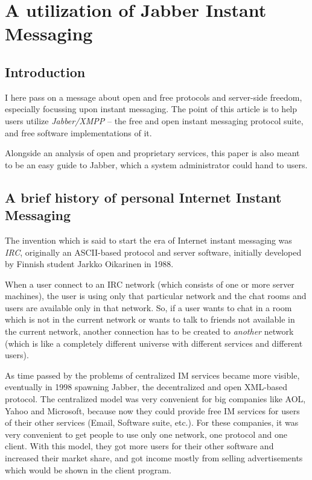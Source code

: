 \begin{savequote}
\end{savequote}
\chapter{A utilization of Jabber Instant Messaging}
\label{c:jim_client_server}


\section{Introduction}
\label{s:jim_client_server:introduction}

I here pass on a message about open and free protocols and server-side freedom,
especially focussing upon instant messaging. The point of this article is to
help users utilize \textit{Jabber/XMPP} – the free and open instant messaging
protocol suite, and free software implementations of it.

Alongside an analysis of open and proprietary services, this paper is also meant
to be an easy guide to Jabber, which a system administrator could hand to users.


\section{A brief history of personal Internet Instant Messaging}
\label{s:jim_client_server:history}

The invention which is said to start the era of Internet instant messaging was
\textit{IRC}, originally an ASCII-based protocol and server software, initially
developed by F\hbox{}innish student Jarkko Oikarinen in 1988.

When a user connect to an IRC network (which consists of one or more server
machines), the user is  using only that particular network and the chat rooms
and users are available only in that network. So, if a user wants to chat in a
room which is not in the current network or wants to talk to friends not
available in the current network, another connection has to be created to
\textit{another} network (which is like a completely dif\hbox{}ferent universe
with dif\hbox{}ferent services and dif\hbox{}ferent users).

As time passed by the problems of centralized IM services became more visible,
eventually in 1998 spawning Jabber, the decentralized and open XML-based
protocol.  The centralized model was very convenient for big companies like AOL,
Yahoo and Microsoft, because now they could provide free IM services for users
of their other services (Email, Software suite, etc.). For these companies, it
was very convenient to get people to use only one network, one protocol and one
client. With this model, they got more users for their other software and
increased their market share, and got income mostly from selling advertisements
which would be shown in the client program.


